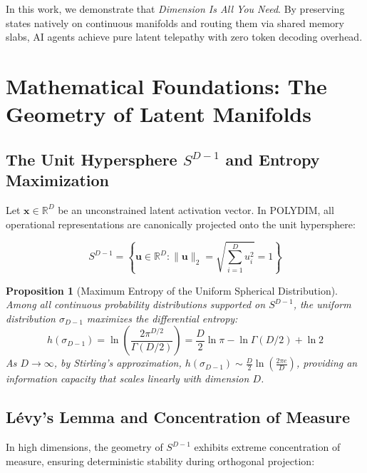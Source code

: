 \documentclass[11pt,twoside,a4paper]{article}
\theoremstyle{plain}
\newtheorem{proposition}[theorem]{Proposition}
\theoremstyle{definition}
\theoremstyle{remark}
\newcommand{\R}{\mathbb{R}}
\begin{document}
In this work, we demonstrate that \textit{Dimension Is All You Need}. By preserving states natively on continuous manifolds and routing them via shared memory slabs, AI agents achieve pure latent telepathy with zero token decoding overhead.

\section{Mathematical Foundations: The Geometry of Latent Manifolds}
\label{sec:math_geometry}

\subsection{The Unit Hypersphere $S^{D-1}$ and Entropy Maximization}

Let $\mathbf{x} \in \R^D$ be an unconstrained latent activation vector. In POLYDIM, all operational representations are canonically projected onto the unit hypersphere:

\begin{equation}
S^{D-1} = \left\{ \mathbf{u} \in \R^D : \|\mathbf{u}\|_2 = \sqrt{\sum_{i=1}^D u_i^2} = 1 \right\}
\end{equation}

\begin{proposition}[Maximum Entropy of the Uniform Spherical Distribution]
Among all continuous probability distributions supported on $S^{D-1}$, the uniform distribution $\sigma_{D-1}$ maximizes the differential entropy:
\begin{equation}
h(\sigma_{D-1}) = \ln \left( \frac{2 \pi^{D/2}}{\Gamma(D/2)} \right) = \frac{D}{2} \ln \pi - \ln \Gamma(D/2) + \ln 2
\end{equation}
As $D \to \infty$, by Stirling's approximation, $h(\sigma_{D-1}) \sim \frac{D}{2} \ln \left(\frac{2\pi e}{D}\right)$, providing an information capacity that scales linearly with dimension $D$.
\end{proposition}

\subsection{Lévy's Lemma and Concentration of Measure}

In high dimensions, the geometry of $S^{D-1}$ exhibits extreme concentration of measure, ensuring deterministic stability during orthogonal projection:
\end{document}
